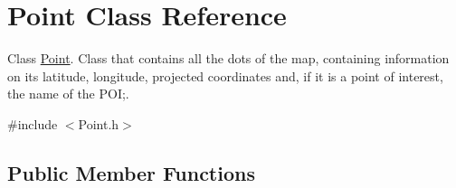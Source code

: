 \hypertarget{class_point}{}\section{Point Class Reference}
\label{class_point}


Class \hyperlink{class_point}{Point}. Class that contains all the dots of the map, containing information on its latitude, longitude, projected coordinates and, if it is a point of interest, the name of the P\+OI;.  




{\ttfamily \#include $<$Point.\+h$>$}

\subsection*{Public Member Functions}
